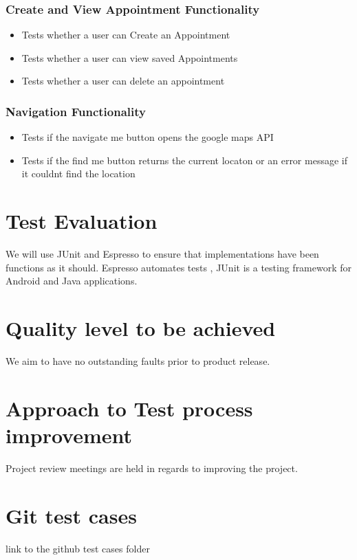 \documentclass[english]{article}
\begin{document}
		\subsubsection{Create and View Appointment Functionality}
		\begin{itemize}
			\item Tests whether a user can Create an Appointment
			\item Tests whether a user can view saved Appointments
			\item Tests whether a user can delete an appointment
		\\
					\href{url}{}
		\end{itemize}
		\subsubsection{Navigation Functionality}
		\begin{itemize}
			\item Tests if the navigate me button opens the google maps API
			\item Tests if the find me button returns the current locaton or an error message if it couldnt find the location
		\\
					\href{url}{}
		\end{itemize}

	\section{Test Evaluation}
	
	We will use JUnit and Espresso to ensure that implementations have been functions as it should.
	Espresso automates tests , JUnit is a testing framework for Android and Java applications.
	\section{Quality level to be achieved}
	We aim to have no outstanding faults prior to product release.
	
	\section{Approach to Test process improvement}
	
	Project review meetings are held in regards to improving the project.
	\section{Git test cases  }
	link to the github test cases folder
\end{document}
